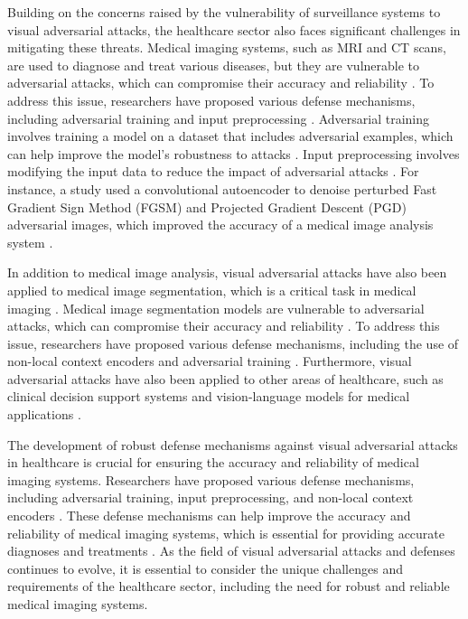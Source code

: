 \documentclass[11pt]{article}
\begin{document}
Building on the concerns raised by the vulnerability of surveillance systems to visual adversarial attacks, the healthcare sector also faces significant challenges in mitigating these threats. Medical imaging systems, such as MRI and CT scans, are used to diagnose and treat various diseases, but they are vulnerable to adversarial attacks, which can compromise their accuracy and reliability \cite{ref121}. To address this issue, researchers have proposed various defense mechanisms, including adversarial training and input preprocessing \cite{ref8}. Adversarial training involves training a model on a dataset that includes adversarial examples, which can help improve the model's robustness to attacks \cite{ref8}. Input preprocessing involves modifying the input data to reduce the impact of adversarial attacks \cite{ref8}. For instance, a study used a convolutional autoencoder to denoise perturbed Fast Gradient Sign Method (FGSM) and Projected Gradient Descent (PGD) adversarial images, which improved the accuracy of a medical image analysis system \cite{ref123}.

In addition to medical image analysis, visual adversarial attacks have also been applied to medical image segmentation, which is a critical task in medical imaging \cite{ref124}. Medical image segmentation models are vulnerable to adversarial attacks, which can compromise their accuracy and reliability \cite{ref124}. To address this issue, researchers have proposed various defense mechanisms, including the use of non-local context encoders and adversarial training \cite{ref125}. Furthermore, visual adversarial attacks have also been applied to other areas of healthcare, such as clinical decision support systems \cite{ref126} and vision-language models for medical applications \cite{ref127}.

The development of robust defense mechanisms against visual adversarial attacks in healthcare is crucial for ensuring the accuracy and reliability of medical imaging systems. Researchers have proposed various defense mechanisms, including adversarial training, input preprocessing, and non-local context encoders \cite{ref122}. These defense mechanisms can help improve the accuracy and reliability of medical imaging systems, which is essential for providing accurate diagnoses and treatments \cite{ref17}. As the field of visual adversarial attacks and defenses continues to evolve, it is essential to consider the unique challenges and requirements of the healthcare sector, including the need for robust and reliable medical imaging systems.
\end{document}
